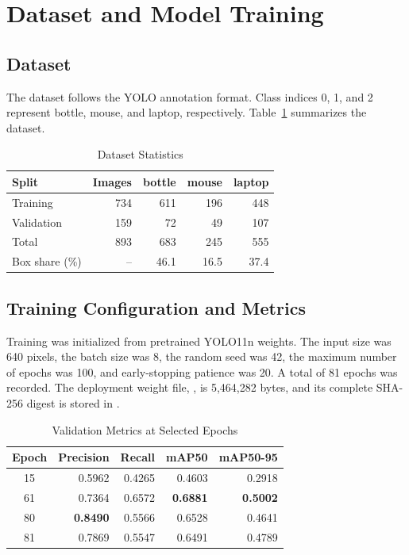 \documentclass[a4paper,conference]{IEEEtran}
\begin{document}
\section{Dataset and Model Training}

\subsection{Dataset}
The dataset follows the YOLO annotation format. Class indices 0, 1, and 2 represent bottle, mouse, and laptop, respectively. Table~\ref{tab:dataset} summarizes the dataset.

\begin{table}[!t]
\caption{Dataset Statistics}
\label{tab:dataset}
\centering
\footnotesize
\begin{tabular}{lrrrr}
\toprule
Split & Images & bottle & mouse & laptop \\
\midrule
Training & 734 & 611 & 196 & 448 \\
Validation & 159 & 72 & 49 & 107 \\
\midrule
Total & 893 & 683 & 245 & 555 \\
Box share (\%) & -- & 46.1 & 16.5 & 37.4 \\
\bottomrule
\end{tabular}
\end{table}

\subsection{Training Configuration and Metrics}
Training was initialized from pretrained YOLO11n weights. The input size was 640 pixels, the batch size was 8, the random seed was 42, the maximum number of epochs was 100, and early-stopping patience was 20. A total of 81 epochs was recorded. The deployment weight file, , is 5,464,282 bytes, and its complete SHA-256 digest is stored in .

\begin{table}[!t]
\caption{Validation Metrics at Selected Epochs}
\label{tab:metrics}
\centering
\footnotesize
\begin{tabular}{crrrr}
\toprule
Epoch & Precision & Recall & mAP50 & mAP50-95 \\
\midrule
15 & 0.5962 & 0.4265 & 0.4603 & 0.2918 \\
61 & 0.7364 & 0.6572 & \textbf{0.6881} & \textbf{0.5002} \\
80 & \textbf{0.8490} & 0.5566 & 0.6528 & 0.4641 \\
81 & 0.7869 & 0.5547 & 0.6491 & 0.4789 \\
\bottomrule
\end{tabular}
\end{table}
\end{document}

